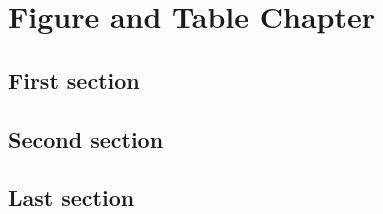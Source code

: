 \chapter{Figure and Table Chapter}
\lipsum[5]
\section{First section}
\lipsum[2-3]

\section{Second section} 
\lipsum[4-5]

\section{Last section}
\lipsum[6-7]